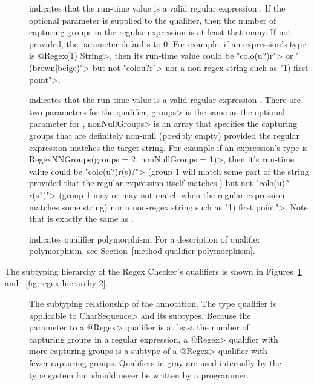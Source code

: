 \begin{description}

\item[]
  indicates that the run-time value is a valid regular expression
  .  If the optional parameter is supplied to the qualifier,
  then the number of capturing groups in the regular expression is at least
  that many. If not provided, the parameter defaults to 0.
  For example, if an expression's type is \<@Regex(1) String>, then its
  run-time value could be \<"colo(u?)r"> or \<"(brown|beige)"> but not
  \<"colou?r"> nor a non-regex string such as \<"1) first point">.

\item[]
  indicates that the run-time value is a valid regular expression
  . There are two parameters for the qualifier, \<groups>
  is the same as the optional parameter for , \<nonNullGroups>
  is an array that specifies the capturing groups that are definitely
  non-null (possibly empty) provided the regular expression matches the
  target string. For example if an expression's type is
  \<RegexNNGroups(groups = 2, nonNullGroups = {1})>, then it's run-time
  value could be \<"colo(u?)r(s)?"> (group 1 will match some part of the string
  provided that the regular expression itself matches.)
  but not \<"colo(u)?r(s?)"> (group 1 may or may not match when the regular
  expression matches some string) nor a
  non-regex string such as \<"1) first point">. Note that 
  is exactly the same as .

\item[]
  indicates qualifier polymorphism.
  For a description of qualifier polymorphism, see
  Section~\ref{method-qualifier-polymorphism}.

\end{description}

The subtyping hierarchy of the Regex Checker's qualifiers is shown in
Figures~\ref{fig-regex-hierarchy-1} and ~\ref{fig-regex-hierarchy-2}.

\begin{figure}
\caption{The subtyping relationship of the  annotation.
  The type qualifier is applicable to \<CharSequence> and its subtypes.
  Because the parameter to a \<@Regex> qualifier is at least the number of
  capturing groups in a regular expression, a \<@Regex> qualifier with more
  capturing groups is a subtype of a \<@Regex> qualifier with fewer capturing
  groups. Qualifiers in gray are used internally by the type
  system but should never be written by a programmer.}
\label{fig-regex-hierarchy-1}
\end{figure}

